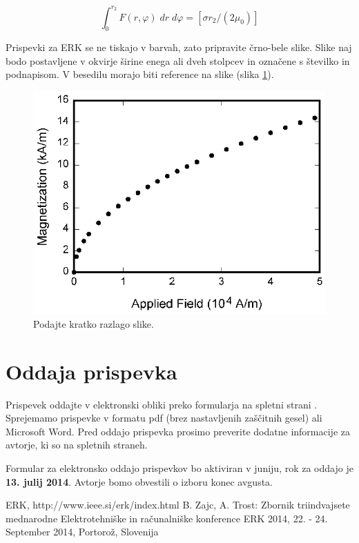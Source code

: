 \documentclass[a4paper]{article}
\begin{document}
\begin{equation}
 \int^{r_{2}}_{0}F(r,\varphi)\; dr\; d\varphi= [\sigma r_{2} / (2\mu_{0})]
    \label{eq1}
\end{equation}

Prispevki za ERK se ne tiskajo v barvah, zato pripravite črno-bele slike. Slike naj bodo postavljene v okvirje širine enega ali dveh stolpcev in označene s številko in podnapisom. V besedilu morajo biti reference na slike (slika \ref{slika}).

\begin{figure}[!htb]
    \begin{center}
        \includegraphics[scale=1]{field1.eps}
        \caption{Podajte kratko razlago slike.} \label{slika}
    \end{center}
\end{figure}

\section{Oddaja prispevka}

Prispevek oddajte v elektronski obliki preko formularja na spletni strani \cite{ERK}. Sprejemamo prispevke v formatu pdf (brez nastavljenih zaščitnih gesel) ali Microsoft Word. Pred oddajo prispevka prosimo preverite dodatne informacije za avtorje, ki so na spletnih straneh. 

Formular za elektronsko oddajo prispevkov bo aktiviran v juniju, rok za oddajo je \textbf{13. julij 2014}. Avtorje bomo obvestili o izboru konec avgusta.

\small
\begin{thebibliography}{1}

 ERK, http://www.ieee.si/erk/index.html 
 B. Zajc, A. Trost: Zbornik triindvajsete mednarodne Elektrotehniške in računalniške konference ERK 2014, 22. - 24. September 2014, Portorož, Slovenija

\end{thebibliography}
\end{document}
